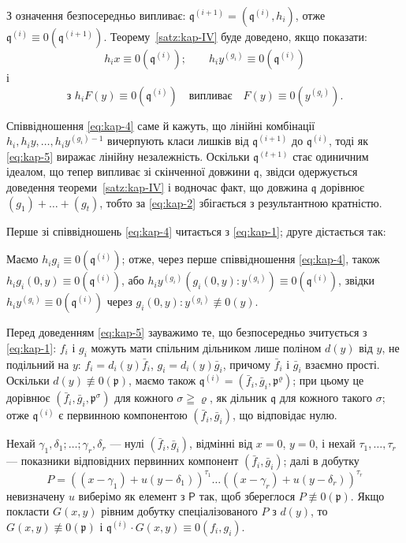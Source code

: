 \documentclass[11pt]{article}
\theoremstyle{plain}
\begin{document}
З означення безпосередньо випливає:
$\mathfrak{q}^{(i+1)} = (\mathfrak{q}^{(i)}, h_{i})$, отже
$\mathfrak{q}^{(i)} \equiv 0(\mathfrak{q}^{(i+1)})$.
Теорему~\ref{satz:kap-IV} буде доведено, якщо показати:
\begin{equation}\label{eq:kap-4}
h_{i}x \equiv 0(\mathfrak{q}^{(i)}); \qquad
h_{i}y^{(g_{i})} \equiv 0(\mathfrak{q}^{(i)})
\end{equation}
і
\begin{equation}\label{eq:kap-5}
\text{з } h_{i}F(y) \equiv 0(\mathfrak{q}^{(i)})
\quad\text{випливає}\quad F(y) \equiv 0(y^{(g_{i})}).
\end{equation}

Співвідношення \eqref{eq:kap-4} саме й кажуть, що лінійні комбінації
$h_{i}, h_{i}y, \ldots, h_{i}y^{(g_{i})-1}$ вичерпують класи лишків
від $\mathfrak{q}^{(i+1)}$ до $\mathfrak{q}^{(i)}$, тоді як
\eqref{eq:kap-5} виражає лінійну незалежність. Оскільки
$\mathfrak{q}^{(t+1)}$ стає одиничним ідеалом, що тепер випливає зі
скінченної довжини $\mathfrak{q}$, звідси одержується доведення
теореми~\ref{satz:kap-IV} і водночас факт, що довжина
$\mathfrak{q}$ дорівнює $(g_1)+\ldots+(g_t)$, тобто за
\eqref{eq:kap-2} збігається з результантною кратністю.

Перше зі співвідношень \eqref{eq:kap-4} читається з
\eqref{eq:kap-1}; друге дістається так:

Маємо $h_{i}g_{i} \equiv 0(\mathfrak{q}^{(i)})$; отже, через перше
співвідношення \eqref{eq:kap-4}, також
$h_{i}g_{i}(0,y) \equiv 0(\mathfrak{q}^{(i)})$, або
$h_{i}y^{(g_{i})}(g_{i}(0,y):y^{(g_{i})})
\equiv 0(\mathfrak{q}^{(i)})$, звідки
$h_{i}y^{(g_{i})} \equiv 0(\mathfrak{q}^{(i)})$ через
$g_{i}(0,y):y^{(g_{i})} \not\equiv 0(y)$.

Перед доведенням \eqref{eq:kap-5} зауважимо те, що безпосередньо
зчитується з \eqref{eq:kap-1}: $f_{i}$ і $g_{i}$ можуть мати
спільним дільником лише поліном $d(y)$ від $y$, не подільний на
$y$: $f_{i} = d_{i}(y)\bar{f}_{i}$,
$g_{i} = d_{i}(y)\bar{g}_{i}$, причому $\bar{f}_{i}$ і
$\bar{g}_{i}$ взаємно прості. Оскільки
$d(y) \not\equiv 0(\mathfrak{p})$, маємо також
$\mathfrak{q}^{(i)} = (\bar{f}_{i}, \bar{g}_{i}, \mathfrak{p}^{\varrho})$;
при цьому це дорівнює
$(\bar{f}_{i}, \bar{g}_{i}, \mathfrak{p}^{\sigma})$ для кожного
$\sigma\geqq\varrho$, як дільник $\mathfrak{q}$ для кожного такого
$\sigma$; отже $\mathfrak{q}^{(i)}$ є первинною компонентою
$(\bar{f}_{i}, \bar{g}_{i})$, що відповідає нулю.

Нехай $\gamma_{1}, \delta_{1}; \ldots; \gamma_{r}, \delta_{r}$ ---
нулі $(\bar{f}_{i}, \bar{g}_{i})$, відмінні від $x = 0$, $y = 0$, і
нехай $\tau_{1}, \ldots, \tau_{r}$ --- показники відповідних
первинних компонент $(\bar{f}_{i}, \bar{g}_{i})$; далі в добутку
\[
P = ((x-\gamma_{1}) + u(y-\delta_{1}))^{\tau_{1}} \ldots
((x-\gamma_{r}) + u(y-\delta_{r}))^{\tau_{r}}
\]
невизначену $u$ виберімо як елемент з $\mathsf{P}$ так, щоб збереглося
$P \not\equiv 0(\mathfrak{p})$. Якщо покласти $G(x,y)$ рівним
добутку спеціалізованого $P$ з $d(y)$, то
$G(x,y) \not\equiv 0(\mathfrak{p})$ і
$\mathfrak{q}^{(i)} \cdot G(x,y) \equiv 0(f_{i}, g_{i})$.
\end{document}
